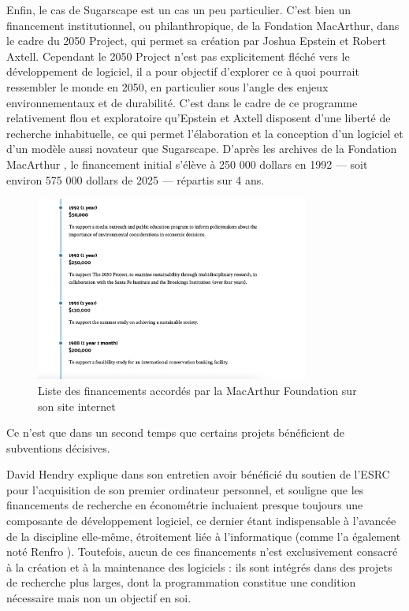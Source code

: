 Enfin, le cas de Sugarscape est un cas un peu particulier. C'est bien un financement institutionnel, ou philanthropique, de la Fondation MacArthur, dans le cadre du 2050 Project, qui permet sa création par Joshua Epstein et Robert Axtell. Cependant le 2050 Project n'est pas explicitement fléché vers le développement de logiciel, il a pour objectif d'explorer ce à quoi pourrait ressembler le monde en 2050, en particulier sous l’angle des enjeux environnementaux et de durabilité. C'est dans le cadre de ce programme relativement flou et exploratoire qu'Epstein et Axtell disposent d’une liberté de recherche inhabituelle, ce qui permet l'élaboration et la conception d’un logiciel et d'un modèle aussi novateur que Sugarscape. D’après les archives de la Fondation MacArthur \cite{MacArthurG}, le financement initial s’élève à 250 000 dollars en 1992 — soit environ 575 000 dollars de 2025 — répartis sur 4 ans.

\begin{figure}[h]
  \centering
  \includegraphics[width=0.8\textwidth]{figures/MacArthur_grants.png}
  \caption{Liste des financements accordés par la MacArthur Foundation sur son site internet}
  \label{fig:graph_grants_Project2050}
\end{figure}


Ce n’est que dans un second temps que certains projets bénéficient de subventions décisives. 

David Hendry explique dans son entretien avoir bénéficié du soutien de l’ESRC pour l’acquisition de son premier ordinateur personnel, et souligne que les financements de recherche en économétrie incluaient presque toujours une composante de développement logiciel, ce dernier étant indispensable à l’avancée de la discipline elle-même, étroitement liée à l’informatique (comme l’a également noté Renfro \cite{renfroEconometricsComputerLove2011} \cite{renfroEconometricSoftwareFirst2004}). Toutefois, aucun de ces financements n'est exclusivement consacré à la création et à la maintenance des logiciels : ils sont intégrés dans des projets de recherche plus larges, dont la programmation constitue une condition nécessaire mais non un objectif en soi.

